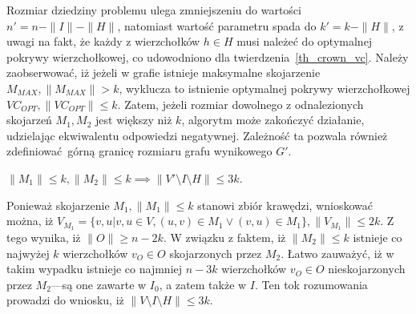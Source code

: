 Rozmiar dziedziny problemu ulega zmniejszeniu do wartości
$n\prime=n-\|I\|-\|H\|$, natomiast wartość parametru spada do $k\prime=k-\|H\|$,
z uwagi na fakt, że każdy z wierzchołków $h \in H$ musi należeć do optymalnej
pokrywy wierzchołkowej, co udowodniono dla twierdzenia~\ref{th_crown_vc}.
Należy zaobserwować, iż jeżeli w grafie istnieje maksymalne skojarzenie
$M_{MAX}, \|M_{MAX}\| > k$, wyklucza to istnienie optymalnej pokrywy
wierzchołkowej $VC_{OPT}, \|VC_{OPT}\|\leq k$. Zatem, jeżeli rozmiar dowolnego 
z odnalezionych skojarzeń $M_1, M_2$  jest większy niż $k$, algorytm może
zakończyć działanie, udzielając ekwiwalentu odpowiedzi negatywnej.
Zależność ta pozwala również zdefiniować górną granicę rozmiaru grafu wynikowego
$G\prime$.

\begin{theorem}
  $\|M_1\| \leq k, \|M_2\| \leq k \implies \|V\prime \setminus I \setminus H\|
  \leq 3k$.
\end{theorem}
\begin{bproof}
  Ponieważ skojarzenie $M_1, \|M_1\| \leq k$ stanowi zbiór krawędzi, wnioskować
  można, iż $V_{M_1}=\{v, u|v, u \in V, (u,v)\in M_1 \lor (v,u) \in M_1\}, \|V_{M_1}\| \leq
  2k$.
  Z tego wynika, iż $\|O\| \geq n-2k$.
  W związku z faktem, iż $\|M_2\| \leq k$ istnieje co najwyżej $k$ wierzchołków
  $v_O \in O$ skojarzonych przez $M_2$.
  Łatwo zauważyć, iż w takim wypadku istnieje co najmniej $n-3k$ wierzchołków
  $v_O \in O$ nieskojarzonych przez $M_2$---są one zawarte w $I_0$, a zatem
  także w $I$.
  Ten tok rozumowania prowadzi do wniosku, iż $\|V \setminus I \setminus H\|
  \leq 3k$.
\end{bproof}


